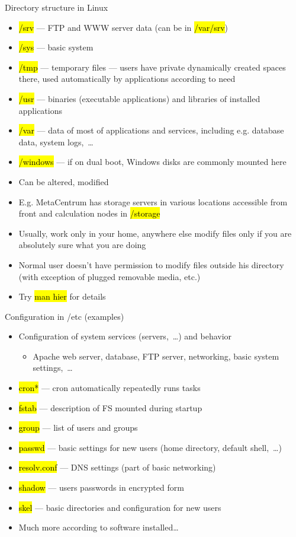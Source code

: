 \documentclass[compress, ucs, xelatex, 11pt, xcolor=svgnames, aspectratio=169,
	hyperref={
		bookmarks=true,
		unicode=true,
		colorlinks=true,
		pdftitle={Linux, command line and MetaCentrum},
		plainpages=false,
		pdfauthor={Vojtech Zeisek},
		pdfsubject={Course about use of Linux command line, writing shell scripts and using MetaCentrum of CESNET},
		pdfcreator={XeLaTeX},
		pdfkeywords={Linux, GNU, BASH, shell, command line, MetaCentrum},
		linkcolor=DarkRed, %
		anchorcolor=DarkBlue, %
		citecolor=Indigo, %
		filecolor=NavyBlue, %
		menucolor=DarkMagenta, %
		urlcolor=DarkBlue, %
		pdftex},
	url={hyphens, lowtilde} %
	]{beamer}
\renewcommand{\texttt}[1]{\hl{\ttfamily #1}}
\renewcommand{\alert}[1]{\textcolor{red}{#1}}
\begin{document}
\begin{frame}[allowframebreaks]{Directory structure in Linux}
\begin{itemize}
		\item \texttt{/srv} --- FTP and WWW server data (can be in \texttt{/var/srv})
		\item \texttt{/sys} --- basic system
		\item \texttt{/tmp} --- temporary files --- users have private dynamically created spaces there, used automatically by applications according to need
		\item \texttt{/usr} --- binaries (executable applications) and libraries of installed applications
		\item \alert{\texttt{/var}} --- data of most of applications and services, including e.g. database data, system logs,~\ldots
		\item \alert{\texttt{/windows}} --- if on dual boot, Windows disks are commonly mounted here
		\item Can be altered, modified
		\item E.g. MetaCentrum has storage servers in various locations accessible from front and calculation nodes in \texttt{/storage}
		\item Usually, work only in your home, anywhere else modify files only if you are absolutely sure what you are doing
		\item Normal user doesn't have permission to modify files outside his directory (with exception of plugged removable media, etc.)
		\item Try \texttt{man hier} for details
	\end{itemize}
\end{frame}

\begin{frame}{Configuration in /etc (examples)}
	\begin{itemize}
		\item Configuration of system services (servers,~\ldots) and behavior
		\begin{itemize}
			\item Apache web server, database, FTP server, networking, basic system settings,~\ldots
		\end{itemize}
		\item \texttt{cron*} --- cron automatically repeatedly runs tasks
		\item \texttt{fstab} --- description of FS mounted during startup
		\item \texttt{group} --- list of users and groups
		\item \texttt{passwd} --- basic settings for new users (home directory, default shell,~\ldots)
		\item \texttt{resolv.conf} ---  DNS settings (part of basic networking)
		\item \texttt{shadow} --- users passwords in encrypted form
		\item \texttt{skel} --- basic directories and configuration for new users
		\item Much more according to software installed\ldots
	\end{itemize}
\end{frame}
\end{document}

